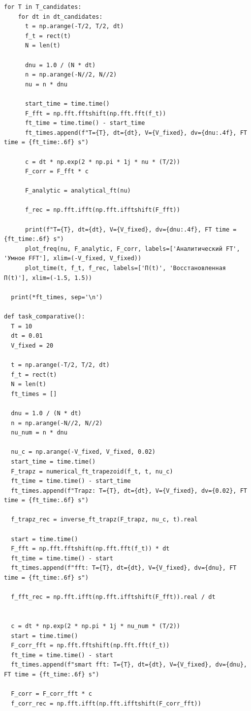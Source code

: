 \documentclass[a4paper]{article}
\begin{document}
\begin{lstlisting}[caption={Исходный код}]
  for T in T_candidates:
    for dt in dt_candidates:
      t = np.arange(-T/2, T/2, dt)
      f_t = rect(t)
      N = len(t)

      dnu = 1.0 / (N * dt)
      n = np.arange(-N//2, N//2)
      nu = n * dnu

      start_time = time.time()
      F_fft = np.fft.fftshift(np.fft.fft(f_t))
      ft_time = time.time() - start_time
      ft_times.append(f"T={T}, dt={dt}, V={V_fixed}, dv={dnu:.4f}, FT time = {ft_time:.6f} s")

      c = dt * np.exp(2 * np.pi * 1j * nu * (T/2))
      F_corr = F_fft * c

      F_analytic = analytical_ft(nu)

      f_rec = np.fft.ifft(np.fft.ifftshift(F_fft))

      print(f"T={T}, dt={dt}, V={V_fixed}, dv={dnu:.4f}, FT time = {ft_time:.6f} s")
      plot_freq(nu, F_analytic, F_corr, labels=['Аналитический FT', 'Умное FFT'], xlim=(-V_fixed, V_fixed))
      plot_time(t, f_t, f_rec, labels=['П(t)', 'Восстановленная П(t)'], xlim=(-1.5, 1.5))

  print(*ft_times, sep='\n')

def task_comparative():
  T = 10
  dt = 0.01
  V_fixed = 20

  t = np.arange(-T/2, T/2, dt)
  f_t = rect(t)
  N = len(t)
  ft_times = []

  dnu = 1.0 / (N * dt)
  n = np.arange(-N//2, N//2)
  nu_num = n * dnu

  nu_c = np.arange(-V_fixed, V_fixed, 0.02)
  start_time = time.time()
  F_trapz = numerical_ft_trapezoid(f_t, t, nu_c)
  ft_time = time.time() - start_time
  ft_times.append(f"Trapz: T={T}, dt={dt}, V={V_fixed}, dv={0.02}, FT time = {ft_time:.6f} s")

  f_trapz_rec = inverse_ft_trapz(F_trapz, nu_c, t).real

  start = time.time()
  F_fft = np.fft.fftshift(np.fft.fft(f_t)) * dt
  ft_time = time.time() - start
  ft_times.append(f"fft: T={T}, dt={dt}, V={V_fixed}, dv={dnu}, FT time = {ft_time:.6f} s")

  f_fft_rec = np.fft.ifft(np.fft.ifftshift(F_fft)).real / dt


  c = dt * np.exp(2 * np.pi * 1j * nu_num * (T/2))
  start = time.time()
  F_corr_fft = np.fft.fftshift(np.fft.fft(f_t))
  ft_time = time.time() - start
  ft_times.append(f"smart fft: T={T}, dt={dt}, V={V_fixed}, dv={dnu}, FT time = {ft_time:.6f} s")

  F_corr = F_corr_fft * c
  f_corr_rec = np.fft.ifft(np.fft.ifftshift(F_corr_fft))


\end{lstlisting}
\end{document}
